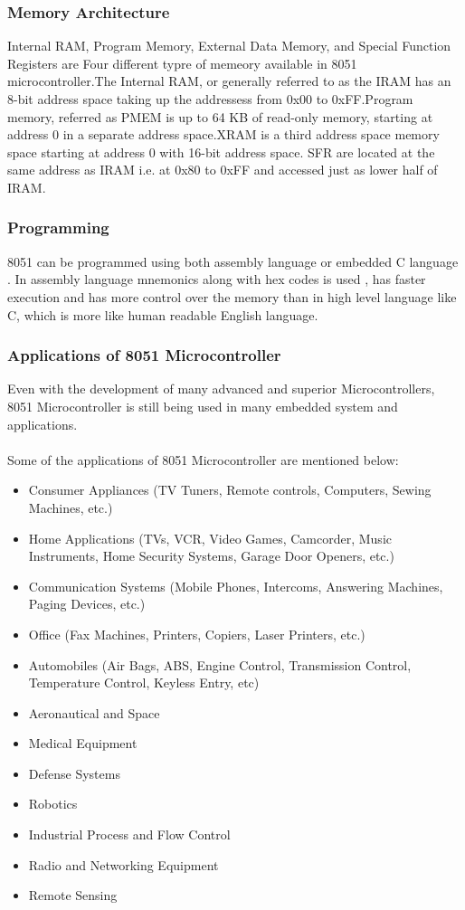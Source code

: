 \documentclass[a4paper,12pt]{article}
\begin{document}
\subsubsection{Memory Architecture}
 Internal RAM, Program Memory, External Data Memory, and Special Function Registers are Four different typre of memeory  available in 8051 microcontroller.The Internal RAM, 
 or generally referred to as the IRAM has an 8-bit address space taking up the addressess from 0x00 to 0xFF.Program memory, referred as PMEM is up to 64 KB of read-only memory, 
 starting at address 0 in a separate address space.XRAM is a third address space memory space starting at address 0 with 16-bit address space.
 SFR are located at the same address as IRAM i.e. at 0x80 to 0xFF and accessed just as lower half of IRAM. 

\subsubsection{Programming}
8051 can be programmed using both assembly language or embedded C language . In assembly language  mnemonics  along with hex codes is used ,
 has faster execution and has more control over the  memory than in high level language like C, which is more like human readable English language.
\subsubsection{Applications of 8051 Microcontroller}
Even with the development of many advanced and superior Microcontrollers, 8051 Microcontroller is still being used in many embedded system and applications.\\\\

Some of the applications of 8051 Microcontroller are mentioned below: 
\begin{itemize}
\item Consumer Appliances (TV Tuners, Remote controls, Computers, Sewing Machines, etc.)
\item Home Applications (TVs, VCR, Video Games, Camcorder, Music Instruments, Home Security Systems, Garage Door Openers, etc.)
\item Communication Systems (Mobile Phones, Intercoms, Answering Machines, Paging Devices, etc.)
\item Office (Fax Machines, Printers, Copiers, Laser Printers, etc.)
\item Automobiles (Air Bags, ABS, Engine Control, Transmission Control, Temperature Control, Keyless Entry, etc)
\item Aeronautical and Space
\item Medical Equipment
\item Defense Systems
\item Robotics
\item Industrial Process and Flow Control
\item Radio and Networking Equipment
\item Remote Sensing
\end{itemize}
\end{document}
